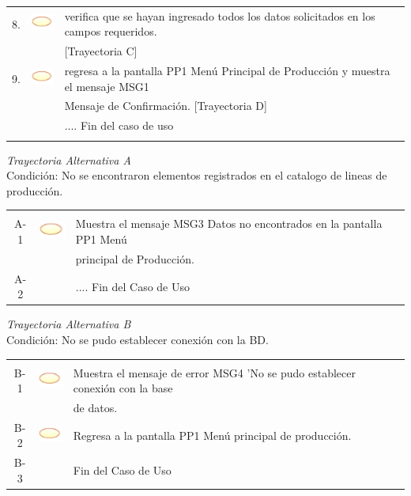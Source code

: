 \documentclass[10pt,spanish]{article}
\providecommand{\tabularnewline}{\\}
\begin{document}
\begin{tabular}{ccl}
	8. & \includegraphics{sistema} & verifica que se hayan ingresado todos los datos solicitados en los campos requeridos.\tabularnewline
	& & [Trayectoria C]\tabularnewline
	9. & \includegraphics{sistema} & regresa a la pantalla PP1 Menú Principal de Producción y muestra el mensaje MSG1\tabularnewline
	& &  Mensaje de Confirmación. [Trayectoria D]\tabularnewline	 
	 &  & .... Fin del caso de uso\tabularnewline \\
	\end{tabular}			
	
	\textit{Trayectoria Alternativa A}\\
	Condición: No se encontraron elementos registrados en el catalogo de lineas de producción.\\
	\begin{tabular}{ccl}
	& & \tabularnewline
	A-1 & \includegraphics{sistema} & Muestra el mensaje MSG3 Datos no encontrados en la pantalla PP1 Menú  \tabularnewline
	& & principal de Producción.\tabularnewline	
	A-2 & & .... Fin del Caso de Uso\tabularnewline
	\end{tabular}	
	\newpage
	\textit{Trayectoria Alternativa B}\\
	Condición: No se pudo establecer conexión con la BD.\\
	\begin{tabular}{ccl}
	& & \tabularnewline
	B-1 & \includegraphics{sistema} & Muestra el mensaje de error MSG4 'No se pudo establecer conexión con la base\tabularnewline
	& & de datos.\tabularnewline
	B-2 & \includegraphics{sistema} & Regresa a la pantalla PP1 Menú principal de producción.\tabularnewline
	B-3 & & Fin del Caso de Uso\tabularnewline	
	\end{tabular}	
\end{document}
